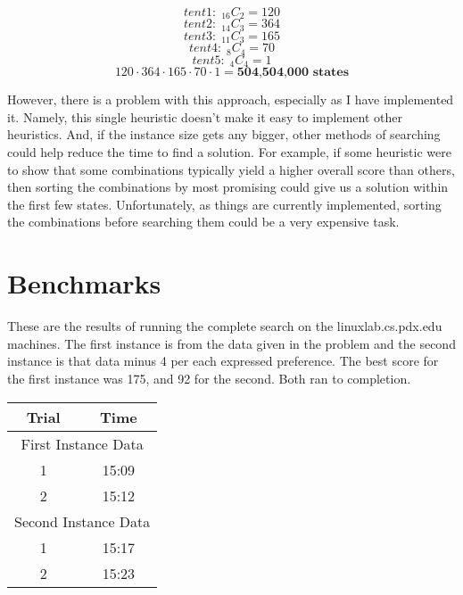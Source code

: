\documentclass{article}
\begin{document}
\begin{displaymath} tent 1:\; _{16}C_{2} = 120 \end{displaymath}
\begin{displaymath} tent 2:\; _{14}C_{3} = 364 \end{displaymath}
\begin{displaymath} tent 3:\; _{11}C_{3} = 165 \end{displaymath}
\begin{displaymath} tent 4:\; _{8}C_{4} = 70 \end{displaymath}
\begin{displaymath} tent 5:\; _{4}C_{4} = 1 \end{displaymath}
\begin{displaymath} 120 \cdot 364\cdot165\cdot 70\cdot 1 = \textbf{504,504,000 states} \end{displaymath}

However, there is a problem with this approach, especially as I have implemented it. Namely, this single heuristic doesn't make it easy to implement other heuristics. And, if the instance size gets any bigger, other methods of searching could help reduce the time to find a solution. For example, if some heuristic were to show that some combinations typically yield a higher overall score than others, then sorting the combinations by most promising could give us a solution within the first few states. Unfortunately, as things are currently implemented, sorting the combinations before searching them could be a very expensive task. 

\section{Benchmarks}
These are the results of running the complete search on the linuxlab.cs.pdx.edu machines. The first instance is from the data given in the problem and the second instance is that data minus 4 per each expressed preference. The best score for the first instance was 175, and 92 for the second. Both ran to completion. 

\begin{table}[!th]
\begin{tabular}{|c|c|}
\hline
\textbf{Trial} & \textbf{Time} \\
\hline
\multicolumn{2}{|c|}{First Instance Data} \\
\hline
1 & 15:09 \\
\hline
2 & 15:12 \\
\hline
\multicolumn{2}{|c|}{Second Instance Data} \\
\hline
1 & 15:17 \\
\hline
2 & 15:23 \\
\hline
\end{tabular}
\end{table}
\end{document}
